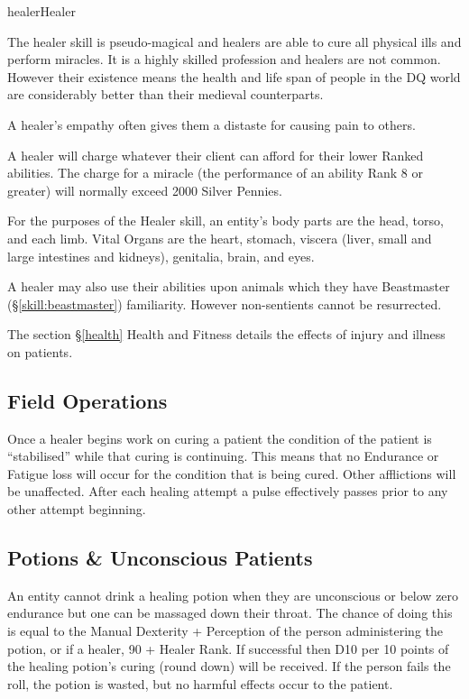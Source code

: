\begin{Skill}[1.4]{healer}{Healer}

The healer skill is pseudo-magical and healers are able to cure all
physical ills and perform miracles.  It is a highly skilled profession
and healers are not common.  However their existence means the health
and life span of people in the DQ world are considerably better than
their medieval counterparts.

A healer’s empathy often gives them a distaste for causing pain to
others.

A healer will charge whatever their client can afford for their lower
Ranked abilities.  The charge for a miracle (the performance of an
ability Rank 8 or greater) will normally exceed 2000 Silver Pennies.

For the purposes of the Healer skill, an entity’s body parts are the
head, torso, and each limb.  Vital Organs are the heart, stomach,
viscera (liver, small and large intestines and kidneys), genitalia,
brain, and eyes.

A healer may also use their abilities upon animals which they have
Beastmaster (\S\ref{skill:beastmaster}) familiarity.  However
non-sentients cannot be resurrected.

The section \S\ref{health} Health and Fitness details the effects of
injury and illness on patients.

\subsection{Field Operations}

Once a healer begins work on curing a patient the condition of the
patient is “stabilised” while that curing is continuing. This means
that no Endurance or Fatigue loss will occur for the condition that is
being cured.  Other afflictions will be unaffected.  After each
healing attempt a pulse effectively passes prior to any other attempt
beginning.

\subsection{Potions \& Unconscious Patients}

An entity cannot drink a healing potion when they are unconscious or
below zero endurance but one can be massaged down their throat. The
chance of doing this is equal to the Manual Dexterity + Perception
of the person administering the potion, or if a healer, 90 + Healer
Rank. If successful then D10 per 10 points of the healing potion’s
curing (round down) will be received. If the person fails the roll,
the potion is wasted, but no harmful effects occur to the patient.


\end{Skill}
